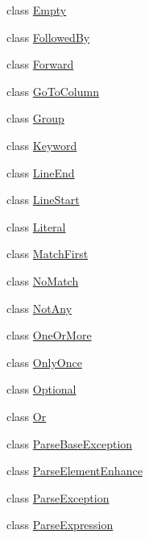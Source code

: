\begin{DoxyCompactItemize}
\item 
class \hyperlink{classsetuptools_1_1__vendor_1_1pyparsing_1_1_empty}{Empty}
\item 
class \hyperlink{classsetuptools_1_1__vendor_1_1pyparsing_1_1_followed_by}{Followed\+By}
\item 
class \hyperlink{classsetuptools_1_1__vendor_1_1pyparsing_1_1_forward}{Forward}
\item 
class \hyperlink{classsetuptools_1_1__vendor_1_1pyparsing_1_1_go_to_column}{Go\+To\+Column}
\item 
class \hyperlink{classsetuptools_1_1__vendor_1_1pyparsing_1_1_group}{Group}
\item 
class \hyperlink{classsetuptools_1_1__vendor_1_1pyparsing_1_1_keyword}{Keyword}
\item 
class \hyperlink{classsetuptools_1_1__vendor_1_1pyparsing_1_1_line_end}{Line\+End}
\item 
class \hyperlink{classsetuptools_1_1__vendor_1_1pyparsing_1_1_line_start}{Line\+Start}
\item 
class \hyperlink{classsetuptools_1_1__vendor_1_1pyparsing_1_1_literal}{Literal}
\item 
class \hyperlink{classsetuptools_1_1__vendor_1_1pyparsing_1_1_match_first}{Match\+First}
\item 
class \hyperlink{classsetuptools_1_1__vendor_1_1pyparsing_1_1_no_match}{No\+Match}
\item 
class \hyperlink{classsetuptools_1_1__vendor_1_1pyparsing_1_1_not_any}{Not\+Any}
\item 
class \hyperlink{classsetuptools_1_1__vendor_1_1pyparsing_1_1_one_or_more}{One\+Or\+More}
\item 
class \hyperlink{classsetuptools_1_1__vendor_1_1pyparsing_1_1_only_once}{Only\+Once}
\item 
class \hyperlink{classsetuptools_1_1__vendor_1_1pyparsing_1_1_optional}{Optional}
\item 
class \hyperlink{classsetuptools_1_1__vendor_1_1pyparsing_1_1_or}{Or}
\item 
class \hyperlink{classsetuptools_1_1__vendor_1_1pyparsing_1_1_parse_base_exception}{Parse\+Base\+Exception}
\item 
class \hyperlink{classsetuptools_1_1__vendor_1_1pyparsing_1_1_parse_element_enhance}{Parse\+Element\+Enhance}
\item 
class \hyperlink{classsetuptools_1_1__vendor_1_1pyparsing_1_1_parse_exception}{Parse\+Exception}
\item 
class \hyperlink{classsetuptools_1_1__vendor_1_1pyparsing_1_1_parse_expression}{Parse\+Expression}

\end{DoxyCompactItemize}
